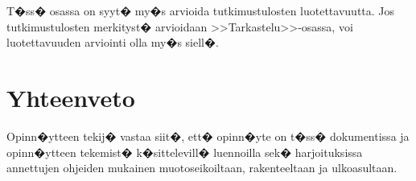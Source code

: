 \documentclass[finnish,12pt,a4paper,pdftex]{article}
\begin{document}
T�ss� osassa on syyt� my�s arvioida tutkimustulosten luotettavuutta.
Jos tutkimustulosten merkityst� arvioidaan >>Tarkastelu>>-osassa,
voi luotettavuuden arviointi olla my�s siell�. 

\clearpage

\section{Yhteenveto}

Opinn�ytteen tekij� vastaa siit�, ett� opinn�yte on t�ss� dokumentissa
ja opinn�ytteen tekemist� k�sittelevill� luennoilla sek�
harjoituksissa annettujen ohjeiden mukainen muotoseikoiltaan,
rakenteeltaan ja ulkoasultaan.
\end{document}
